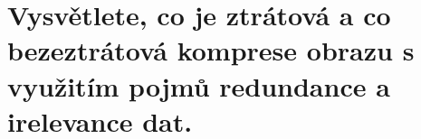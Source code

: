 \section{Vysvětlete, co je ztrátová a co bezeztrátová komprese obrazu s využitím pojmů redundance a irelevance dat.}